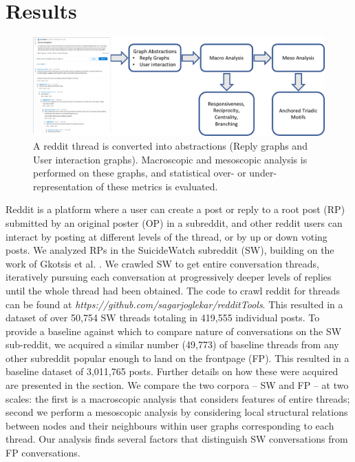 \section{Results}
\begin{figure}[!ht]
    \centering
    \includegraphics[width=0.7\linewidth]{Figures/Pipeline.pdf}
    \caption{A reddit thread is converted into abstractions (Reply graphs and User interaction graphs). Macroscopic and mesoscopic analysis is performed on these graphs, and statistical over- or under- representation of these metrics is evaluated.}
    \label{fig:pipeline}
\end{figure}

Reddit is a platform where a user can create a post or reply to a root post (RP) submitted by an original poster (OP) in a subreddit, and other reddit users can interact by posting at different levels of the thread, or by up or down voting posts. We analyzed RPs in the SuicideWatch subreddit (SW), building on the work of Gkotsis et al. \cite{gkotsis2017characterisation}.
We crawled SW to get entire conversation threads,
iteratively pursuing each conversation at progressively deeper levels of replies until the whole thread had been obtained. The code to crawl reddit for threads can be found at \textit{https://github.com/sagarjoglekar/redditTools}. This resulted in a dataset of over 50,754 SW threads totaling in 419,555 individual posts. 
To provide a baseline against which to compare nature of conversations on the SW sub-reddit, we acquired a similar number (49,773) of baseline threads from any other subreddit popular enough to land on the frontpage (FP). This resulted in a baseline dataset of 3,011,765 posts. Further details on how these were acquired are presented in the  section. We compare the two corpora -- SW and FP -- at two scales: the first is a macroscopic analysis that considers features of entire threads; second we perform a mesoscopic analysis by considering local structural relations between nodes and their neighbours within user graphs corresponding to each thread. Our analysis finds several factors that distinguish SW conversations from FP conversations. %
